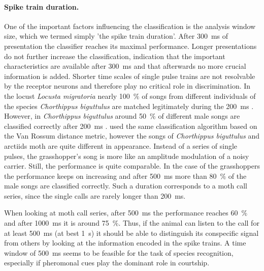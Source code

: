 \documentclass[12pt,a4paper,pdftex]{article}
\newcommand{\species}[1]{\textit{#1}}
\newcommand{\percent}[1]{#1~$\%$}
\begin{document}
\paragraph{Spike train duration.} One of the important factors influencing the classification is the analysis window size, which we termed simply 'the spike train duration'. After 300~ms of presentation the classifier reaches its maximal performance. Longer presentations do not further increase the classification, indication that the important characteristics are available after 300~ms and that afterwards no more crucial information is added. Shorter time scales of single pulse trains are not resolvable by the receptor neurons and therefore play no critical role in discrimination. In the locust \species{Locusta migratoria} nearly \percent{100} of songs from different individuals of the species \species{Chorthippus biguttulus} are matched legitimately during the 200~ms \cite{machens2001a}. However, in \species{Chorthippus biguttulus} around \percent{50} of different male songs are classified correctly after 200~ms \cite{machens2003}. \cite{machens2003} used the same classification algorithm based on the Van Rossum distance metric, however the songs of \species{Chorthippus biguttulus} and arctiids moth are quite different in appearance. Instead of a series of single pulses, the grasshopper's song is more like an amplitude modulation of a noisy carrier. Still, the performance is quite comparable. In the case of the grasshoppers the performance keeps on increasing and after 500~ms more than \percent{80} of the male songs are classified correctly. Such a duration corresponds to a moth call series, since the single calls are rarely longer than 200~ms. 

When looking at moth call series, after 500~ms the performance reaches \percent{60} and after 1000~ms it is around \percent{75}. Thus, if the animal can listen to the call for at least 500~ms (at best 1~s) it should be able to distinguish its conspecific signal from others by looking at the information encoded in the spike trains. A time window of 500~ms seems to be feasible for the task of species recognition, especially if pheromonal cues play the dominant role in courtship.
\end{document}
